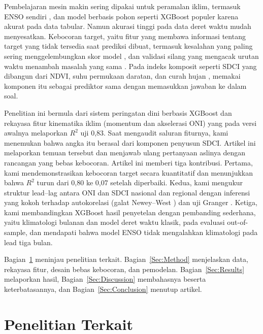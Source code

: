 \documentclass[11pt,twoside]{article}
\begin{document}
Pembelajaran mesin makin sering dipakai untuk peramalan iklim, termasuk ENSO sendiri \cite{ham2019deep}, dan model berbasis pohon seperti XGBoost \cite{chen2016xgboost} populer karena akurat pada data tabular. Namun akurasi tinggi pada data deret waktu mudah menyesatkan. Kebocoran target, yaitu fitur yang membawa informasi tentang target yang tidak tersedia saat prediksi dibuat, termasuk kesalahan yang paling sering menggelembungkan skor model \cite{kaufman2012leakage}, dan validasi silang yang mengacak urutan waktu menambah masalah yang sama \cite{bergmeir2012cv}. Pada indeks komposit seperti SDCI yang dibangun dari NDVI, suhu permukaan daratan, dan curah hujan \cite{rhee2010sdci,kogan1995vci}, memakai komponen itu sebagai prediktor sama dengan memasukkan jawaban ke dalam soal.

Penelitian ini bermula dari sistem peringatan dini berbasis XGBoost dan rekayasa fitur kinematika iklim (momentum dan akselerasi ONI) yang pada versi awalnya melaporkan $R^2$ uji 0,83. Saat mengaudit saluran fiturnya, kami menemukan bahwa angka itu berasal dari komponen penyusun SDCI. Artikel ini melaporkan temuan tersebut dan menjawab ulang pertanyaan aslinya dengan rancangan yang bebas kebocoran. Artikel ini memberi tiga kontribusi. Pertama, kami mendemonstrasikan kebocoran target secara kuantitatif dan menunjukkan bahwa $R^2$ turun dari 0,80 ke 0,07 setelah diperbaiki. Kedua, kami mengukur struktur lead--lag antara ONI dan SDCI nasional dan regional dengan inferensi yang kokoh terhadap autokorelasi (galat Newey--West \cite{newey1987hac}) dan uji Granger \cite{granger1969causality}. Ketiga, kami membandingkan XGBoost hasil penyetelan dengan pembanding sederhana, yaitu klimatologi bulanan dan model deret waktu klasik, pada evaluasi out-of-sample, dan mendapati bahwa model ENSO tidak mengalahkan klimatologi pada lead tiga bulan.

Bagian~\ref{Sec:Related} meninjau penelitian terkait. Bagian~\ref{Sec:Method} menjelaskan data, rekayasa fitur, desain bebas kebocoran, dan pemodelan. Bagian~\ref{Sec:Results} melaporkan hasil, Bagian~\ref{Sec:Discussion} membahasnya beserta keterbatasannya, dan Bagian~\ref{Sec:Conclusion} menutup artikel.

\section{Penelitian Terkait}
\label{Sec:Related}
\end{document}
